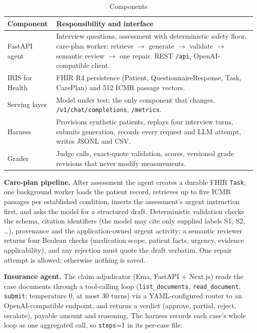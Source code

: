 \documentclass[conference]{IEEEtran}
\begin{document}
\begin{table}[t]
\caption{Components}
\label{tab:components}
\centering\scriptsize
\begin{tabularx}{\columnwidth}{@{}>{\raggedright\arraybackslash}p{2.1cm}X@{}}
\toprule
Component & Responsibility and interface \\
\midrule
FastAPI agent & Interview questions, assessment with deterministic safety floor, care-plan worker: retrieve $\rightarrow$ generate $\rightarrow$ validate $\rightarrow$ semantic review $\rightarrow$ one repair. REST \texttt{/api}, OpenAI-compatible client. \\
IRIS for Health & FHIR R4 persistence (Patient, QuestionnaireResponse, Task, CarePlan) and 512 ICMR passage vectors. \\
Serving layer & Model under test; the only component that changes. \texttt{/v1/chat/completions}, \texttt{/metrics}. \\
Harness & Provisions synthetic patients, replays four interview turns, submits generation, records every request and LLM attempt, writes JSONL and CSV. \\
Grader & Judge calls, exact-quote validation, scores, versioned grade revisions that never modify measurements. \\
\bottomrule
\end{tabularx}
\end{table}

\textbf{Care-plan pipeline.} After assessment the agent creates a durable FHIR \texttt{Task}; one background worker loads the patient record, retrieves up to five ICMR passages per established condition, inserts the assessment's urgent instruction first, and asks the model for a structured draft. Deterministic validation checks the schema, citation identifiers (the model may cite only supplied labels S1, S2, \ldots), provenance and the application-owned urgent activity; a semantic reviewer returns four Boolean checks (medication scope, patient facts, urgency, evidence applicability), and any rejection must quote the draft verbatim. One repair attempt is allowed; otherwise nothing is saved.

\textbf{Insurance agent.} The claim adjudicator (Ema, FastAPI + Next.js) reads the case documents through a tool-calling loop (\texttt{list\_documents}, \texttt{read\_document}, \texttt{submit}; temperature 0, at most 30 turns) via a YAML-configured router to an OpenAI-compatible endpoint, and returns a verdict (approve, partial, reject, escalate), payable amount and reasoning. The harness records each case's whole loop as one aggregated call, so \texttt{steps}=1 in its per-case file.
\end{document}
